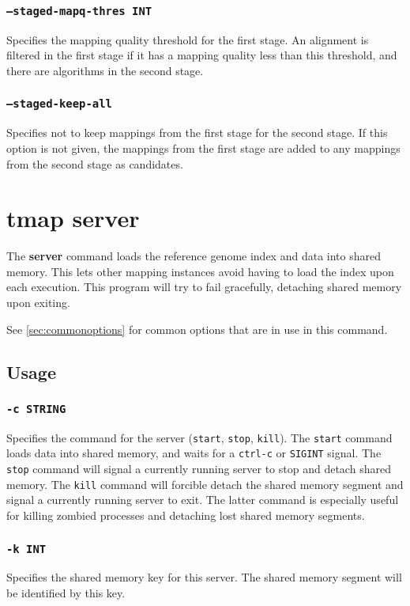 \documentclass[a4paper,12pt]{book}
\newcommand{\TT}[1]{{\tt #1}} %
\newcommand{\BF}[1]{{\bf #1}} %
\begin{document}
\subsubsection{\TT{--staged-mapq-thres INT}}
Specifies the mapping quality threshold for the first stage.
An alignment is filtered in the first stage if it has a mapping quality less than this threshold, and there are algorithms in the second stage.
\subsubsection{\TT{--staged-keep-all}}
Specifies not to keep mappings from the first stage for the second stage.
If this option is not given, the mappings from the first stage are added to any mappings from the second stage as candidates.

\section{tmap server}
\label{sec:server}
The \BF{server} command loads the reference genome index and data into shared memory.
This lets other mapping instances avoid having to load the index upon each execution.
This program will try to fail gracefully, detaching shared memory upon exiting.

See \autoref{sec:commonoptions} for common options that are in use in this command.
\subsection{Usage}

\subsubsection{\TT{-c STRING}}
Specifies the command for the server (\TT{start}, \TT{stop}, \TT{kill}).
The \TT{start} command loads data into shared memory, and waits for a \TT{ctrl-c} or \TT{SIGINT} signal.
The \TT{stop} command will signal a currently running server to stop and detach shared memory.
The \TT{kill} command will forcible detach the shared memory segment and signal a currently running server to exit.
The latter command is especially useful for killing zombied processes and detaching lost shared memory segments.

\subsubsection{\TT{-k INT}}
Specifies the shared memory key for this server.
The shared memory segment will be identified by this key.
\end{document}
